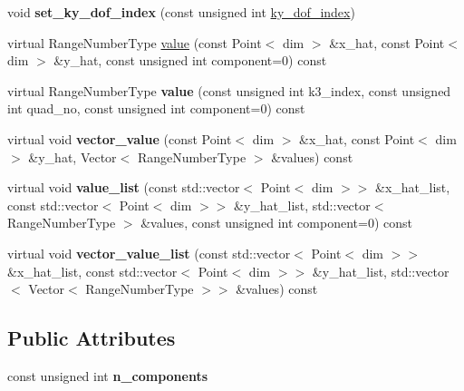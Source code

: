 \begin{DoxyCompactItemize}
void {\bfseries set\+\_\+ky\+\_\+dof\+\_\+index} (const unsigned int \hyperlink{classLaplaceBEM_1_1KernelPulledbackToUnitCell_ae6f3e4bc6cf09546bf11d01812f9b692}{ky\+\_\+dof\+\_\+index})
\item 
virtual Range\+Number\+Type \hyperlink{classLaplaceBEM_1_1KernelPulledbackToUnitCell_ac55bd556acba999c6d71c322eff33cd9}{value} (const Point$<$ dim $>$ \&x\+\_\+hat, const Point$<$ dim $>$ \&y\+\_\+hat, const unsigned int component=0) const
\item 
\mbox{\label{classLaplaceBEM_1_1KernelPulledbackToUnitCell_a72955834d5c6542c1f3216f408afe9f3}} 
virtual Range\+Number\+Type {\bfseries value} (const unsigned int k3\+\_\+index, const unsigned int quad\+\_\+no, const unsigned int component=0) const
\item 
\mbox{\label{classLaplaceBEM_1_1KernelPulledbackToUnitCell_aaea7ab071bb5a2fc03e7f613b0dabb57}} 
virtual void {\bfseries vector\+\_\+value} (const Point$<$ dim $>$ \&x\+\_\+hat, const Point$<$ dim $>$ \&y\+\_\+hat, Vector$<$ Range\+Number\+Type $>$ \&values) const
\item 
\mbox{\label{classLaplaceBEM_1_1KernelPulledbackToUnitCell_a73ddab1e4b36915991549a5476b8a803}} 
virtual void {\bfseries value\+\_\+list} (const std\+::vector$<$ Point$<$ dim $>$$>$ \&x\+\_\+hat\+\_\+list, const std\+::vector$<$ Point$<$ dim $>$$>$ \&y\+\_\+hat\+\_\+list, std\+::vector$<$ Range\+Number\+Type $>$ \&values, const unsigned int component=0) const
\item 
\mbox{\label{classLaplaceBEM_1_1KernelPulledbackToUnitCell_a9aa5a715991470a7e8a69f40426d6cd9}} 
virtual void {\bfseries vector\+\_\+value\+\_\+list} (const std\+::vector$<$ Point$<$ dim $>$$>$ \&x\+\_\+hat\+\_\+list, const std\+::vector$<$ Point$<$ dim $>$$>$ \&y\+\_\+hat\+\_\+list, std\+::vector$<$ Vector$<$ Range\+Number\+Type $>$$>$ \&values) const
\end{DoxyCompactItemize}
\subsection*{Public Attributes}
\begin{DoxyCompactItemize}
\item 
\mbox{\label{classLaplaceBEM_1_1KernelPulledbackToUnitCell_ad351c9674e4bd484e5d5396210abe282}} 
const unsigned int {\bfseries n\+\_\+components}
\end{DoxyCompactItemize}
